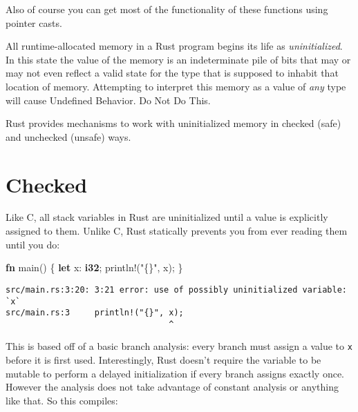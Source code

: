 \documentclass[a4paper,]{book}
\newenvironment{Shaded}{\begin{snugshade}}{\end{snugshade}}
\newcommand{\KeywordTok}[1]{\textcolor[rgb]{0.13,0.29,0.53}{\textbf{{#1}}}}
\newcommand{\StringTok}[1]{\textcolor[rgb]{0.31,0.60,0.02}{{#1}}}
\newcommand{\OtherTok}[1]{\textcolor[rgb]{0.56,0.35,0.01}{{#1}}}
\newcommand{\NormalTok}[1]{{#1}}
\begin{document}
Also of course you can get most of the functionality of these functions
using pointer casts.


All runtime-allocated memory in a Rust program begins its life as
\emph{uninitialized}. In this state the value of the memory is an
indeterminate pile of bits that may or may not even reflect a valid
state for the type that is supposed to inhabit that location of memory.
Attempting to interpret this memory as a value of \emph{any} type will
cause Undefined Behavior. Do Not Do This.

Rust provides mechanisms to work with uninitialized memory in checked
(safe) and unchecked (unsafe) ways.

\section{Checked}\label{sec--checked-uninit}

Like C, all stack variables in Rust are uninitialized until a value is
explicitly assigned to them. Unlike C, Rust statically prevents you from
ever reading them until you do:

\begin{Shaded}
\begin{Highlighting}[]
\KeywordTok{fn} \NormalTok{main() \{}
    \KeywordTok{let} \NormalTok{x: }\KeywordTok{i32}\NormalTok{;}
    \OtherTok{println!}\NormalTok{(}\StringTok{"\{\}"}\NormalTok{, x);}
\NormalTok{\}}
\end{Highlighting}
\end{Shaded}

\begin{verbatim}
src/main.rs:3:20: 3:21 error: use of possibly uninitialized variable: `x`
src/main.rs:3     println!("{}", x);
                                 ^
\end{verbatim}

This is based off of a basic branch analysis: every branch must assign a
value to \texttt{x} before it is first used. Interestingly, Rust doesn't
require the variable to be mutable to perform a delayed initialization
if every branch assigns exactly once. However the analysis does not take
advantage of constant analysis or anything like that. So this compiles:
\end{document}
